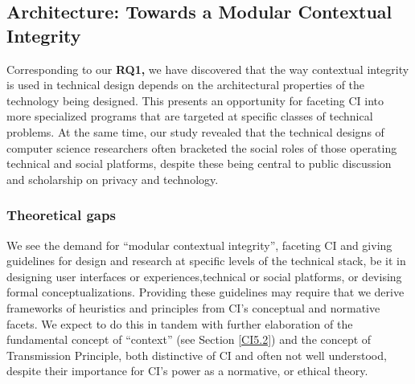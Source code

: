 \documentclass[../thesis.tex]{subfiles}
\begin{document}
\subsection{Architecture: Towards a Modular Contextual Integrity}
\label{CI5.1}

Corresponding to our
\textbf{RQ1,}
we have discovered that the way contextual integrity is used in
technical design depends on the architectural properties of the
technology being designed. This presents an opportunity for faceting CI
into more specialized programs that are targeted at specific classes of
technical problems. At the same time, our study revealed that the
technical designs of computer science researchers often bracketed the
social roles of those operating technical and social platforms, despite
these being central to public discussion and scholarship on privacy and
technology.

\subsubsection{Theoretical gaps}
\label{CI5.1.1}

We see the demand for ``modular contextual
integrity'', faceting CI and giving guidelines for
design and research at specific levels of the technical stack, be it in
designing user interfaces or experiences,technical or social platforms,
or devising formal conceptualizations. Providing these guidelines may
require that we derive frameworks of heuristics and principles from
CI's conceptual and normative facets. We expect to do
this in tandem with further elaboration of the fundamental concept of
``context'' (see Section \ref{CI5.2}) and
the concept of Transmission Principle, both distinctive of CI and often
not well understood, despite their importance for CI's
power as a normative, or ethical theory. 
\end{document}
